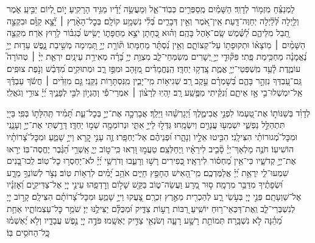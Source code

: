 \documentclass[twoside, openany, parskip=half, 11pt]{book}
\begin{document}
\begin{narrow}
לַמְנַצֵּ֗חַ מִזְמ֥וֹר לְדָוִֽד׃
הַשָּׁמַ֗יִם מְֽסַפְּרִ֥ים כְּבֽוֹד־אֵ֑ל וּֽמַעֲשֵׂ֥ה יָ֝דָ֗יו מַגִּ֥יד הָרָקִֽיעַ׃
י֣וֹם לְ֭יוֹם יַבִּ֣יעַֽ אֹ֑מֶר וְלַ֥יְלָה לְּ֝לַ֗יְלָה יְחַוֶּה־דָּֽעַת׃
אֵֽין־אֹ֭מֶר וְאֵ֣ין דְּבָרִ֑ים בְּ֝לִ֗י נִשְׁמָ֥ע קוֹלָֽם׃
בְּכׇל־הָאָ֨רֶץ ׀ יָ֘צָ֤א קַוָּ֗ם וּבִקְצֵ֣ה תֵ֭בֵל מִלֵּיהֶ֑ם לַ֝שֶּׁ֗מֶשׁ שָֽׂם־אֹ֥הֶל בָּהֶֽם׃
וְה֗וּא כְּ֭חָתָן יֹצֵ֣א מֵחֻפָּת֑וֹ יָשִׂ֥ישׂ כְּ֝גִבּ֗וֹר לָר֥וּץ אֹֽרַח׃
מִקְצֵ֤ה הַשָּׁמַ֨יִם ׀ מֽוֹצָא֗וֹ וּתְקוּפָת֥וֹ עַל־קְצוֹתָ֑ם וְאֵ֥ין נִ֝סְתָּ֗ר מֵחַמָּתֽוֹ׃
תּ֘וֹרַ֤ת יְיָ֣ תְּ֭מִימָה מְשִׁ֣יבַת נָ֑פֶשׁ עֵד֥וּת יְיָ֥ נֶ֝אֱמָנָ֗ה מַחְכִּ֥ימַת פֶּֽתִי׃
פִּקּ֘וּדֵ֤י יְיָ֣ יְ֭שָׁרִים מְשַׂמְּחֵי־לֵ֑ב מִצְוַ֥ת יְיָ֥ בָּ֝רָ֗ה מְאִירַ֥ת עֵינָֽיִם׃
יִרְאַ֤ת יְיָ֨ ׀ טְהוֹרָה֮ עוֹמֶ֢דֶת לָ֫עַ֥ד מִֽשְׁפְּטֵי־יְיָ֥ אֱמֶ֑ת צָֽדְק֥וּ יַחְדָּֽו׃
הַֽנֶּחֱמָדִ֗ים מִ֭זָּהָב וּמִפַּ֣ז רָ֑ב וּמְתוּקִ֥ים מִ֝דְּבַ֗שׁ וְנֹ֣פֶת צוּפִֽים׃
גַּֽם־עַ֭בְדְּךָ נִזְהָ֣ר בָּהֶ֑ם בְּ֝שׇׁמְרָ֗ם עֵ֣קֶב רָֽב׃
שְׁגִיא֥וֹת מִֽי־יָבִ֑ין מִֽנִּסְתָּר֥וֹת נַקֵּֽנִי׃
גַּ֤ם מִזֵּדִ֨ים ׀ חֲשֹׂ֬ךְ עַבְדֶּ֗ךָ אַֽל־יִמְשְׁלוּ־בִ֣י אָ֣ז אֵיתָ֑ם וְ֝נִקֵּ֗יתִי מִפֶּ֥שַֽׁע רָֽב׃
יִ֥הְיֽוּ לְרָצ֨וֹן ׀ אִמְרֵי־פִ֡י וְהֶגְי֣וֹן לִבִּ֣י לְפָנֶ֑יךָ יְ֝יָ֗ צוּרִ֥י וְגֹאֲלִֽי׃


\enlargethispage{\baselineskip}

לְדָוִ֗ד
בְּשַׁנּוֹת֣וֹ אֶת־טַ֭עְמוֹ לִפְנֵ֣י אֲבִימֶ֑לֶךְ וַ֝יְגָרְשֵׁ֗הוּ וַיֵּלַֽךְ׃
אֲבָרְכָ֣ה אֶת־יְיָ֣ בְּכׇל־עֵ֑ת תָּ֝מִ֗יד תְּֽהִלָּת֥וֹ בְּפִֽי׃
בַּייָ֭ תִּתְהַלֵּ֣ל נַפְשִׁ֑י יִשְׁמְע֖וּ עֲנָוִ֣ים וְיִשְׂמָֽחוּ׃
גַּדְּל֣וּ לַייָ֣ אִתִּ֑י וּנְרוֹמְמָ֖ה שְׁמ֣וֹ יַחְדָּֽו׃
דָּרַ֣שְׁתִּי אֶת־יְיָ֣ וְעָנָ֑נִי וּמִכׇּל־מְ֝גוּרוֹתַ֗י הִצִּילָֽנִי׃
הִבִּ֣יטוּ אֵלָ֣יו וְנָהָ֑רוּ וּ֝פְנֵיהֶ֗ם אַל־יֶחְפָּֽרוּ׃
זֶ֤ה עָנִ֣י קָ֭רָא וַייָ֣ שָׁמֵ֑עַ וּמִכׇּל־צָ֝רוֹתָ֗יו הוֹשִׁיעֽוֹ׃
חֹנֶ֤ה מַלְאַךְ־יְיָ֓ סָ֘בִ֤יב לִירֵאָ֗יו וַֽיְחַלְּצֵֽם׃
טַעֲמ֣וּ וּ֭רְאוּ כִּֽי־ט֣וֹב יְיָ֑ אַֽשְׁרֵ֥י הַ֝גֶּ֗בֶר יֶחֱסֶה־בּֽוֹ׃
יְר֣אוּ אֶת־יְיָ֣ קְדֹשָׁ֑יו כִּי־אֵ֥ין מַ֝חְס֗וֹר לִירֵאָֽיו׃
כְּ֭פִירִים רָשׁ֣וּ וְרָעֵ֑בוּ וְדֹרְשֵׁ֥י יְ֝יָ֗ לֹא־יַחְסְר֥וּ כׇל־טֽוֹב׃
לְֽכוּ־בָ֭נִים שִׁמְעוּ־לִ֑י יִֽרְאַ֥ת יְ֝יָ֗ אֲלַמֶּדְכֶֽם׃
מִֽי־הָ֭אִישׁ הֶחָפֵ֣ץ חַיִּ֑ים אֹהֵ֥ב יָ֝מִ֗ים לִרְא֥וֹת טֽוֹב׃
נְצֹ֣ר לְשׁוֹנְךָ֣ מֵרָ֑ע וּ֝שְׂפָתֶ֗יךָ מִדַּבֵּ֥ר מִרְמָֽה׃
ס֣וּר מֵ֭רָע וַעֲשֵׂה־ט֑וֹב בַּקֵּ֖שׁ שָׁל֣וֹם וְרׇדְפֵֽהוּ׃
עֵינֵ֣י יְיָ֭ אֶל־צַדִּיקִ֑ים וְ֝אׇזְנָ֗יו אֶל־שַׁוְעָתָֽם׃
פְּנֵ֣י יְיָ֭ בְּעֹ֣שֵׂי רָ֑ע לְהַכְרִ֖ית מֵאֶ֣רֶץ זִכְרָֽם׃
צָ֭עֲקוּ וַייָ֣ שָׁמֵ֑עַ וּמִכׇּל־צָ֝רוֹתָ֗ם הִצִּילָֽם׃
קָר֣וֹב יְיָ֭ לְנִשְׁבְּרֵי־לֵ֑ב וְֽאֶת־דַּכְּאֵי־ר֥וּחַ יוֹשִֽׁיעַ׃
רַ֭בּוֹת רָע֣וֹת צַדִּ֑יק וּ֝מִכֻּלָּ֗ם יַצִּילֶ֥נּוּ יְיָ׃
שֹׁמֵ֥ר כׇּל־עַצְמוֹתָ֑יו אַחַ֥ת מֵ֝הֵ֗נָּה לֹ֣א נִשְׁבָּֽרָה׃
תְּמוֹתֵ֣ת רָשָׁ֣ע רָעָ֑ה וְשֹׂנְאֵ֖י צַדִּ֣יק יֶאְשָֽׁמוּ׃
פֹּדֶ֣ה יְיָ֭ נֶ֣פֶשׁ עֲבָדָ֑יו וְלֹ֥א יֶ֝אְשְׁמ֗וּ כׇּֽל־הַחֹסִ֥ים בּֽוֹ׃




\end{narrow}
\end{document}
